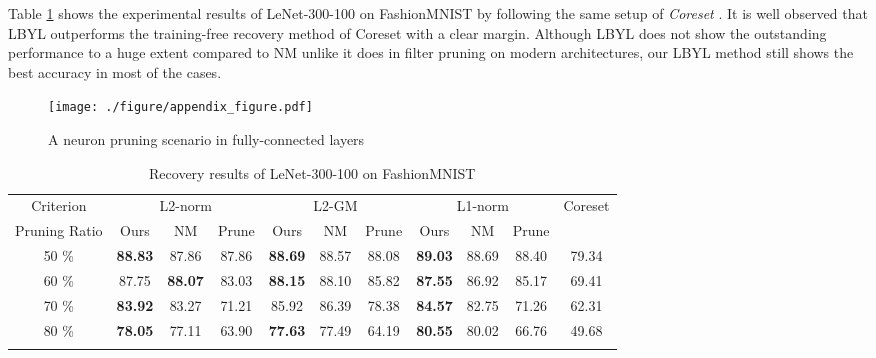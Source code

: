 Table \ref{tab:LeNet_FashionMNIST} shows the experimental results of LeNet-300-100 on FashionMNIST by following the same setup of \textit{Coreset} \cite{CoreSet_ICLR}. It is well observed that LBYL outperforms the training-free recovery method of Coreset with a clear margin. Although LBYL does not show the outstanding performance to a huge extent compared to NM \cite{NM} unlike it does in filter pruning on modern architectures, our LBYL method still shows the best accuracy in most of the cases.


\begin{figure*}[t!]
   \centering 
    \texttt{[image: ./figure/appendix\_figure.pdf]}
   \caption{A neuron pruning scenario in fully-connected layers}
   \label{fig:appendix_figure}
\end{figure*}


\begin{table}[]
\centering
\begin{tabular}{c||ccc||ccc||ccc||c}\hline Criterion& \multicolumn{3}{c||}{L2-norm}& \multicolumn{3}{c||}{L2-GM}& \multicolumn{3}{c||}{L1-norm}& \multirow{2}{*}{Coreset} \\ \cline{1-10}
Pruning Ratio& \multicolumn{1}{c|}{Ours}& \multicolumn{1}{c|}{NM}& Prune & \multicolumn{1}{c|}{Ours}& \multicolumn{1}{c|}{NM}& Prune & \multicolumn{1}{c|}{Ours}& \multicolumn{1}{c|}{NM}& Prune &\\ \hline \Xhline{2\arrayrulewidth}
50 \%& \multicolumn{1}{c|}{\textbf{88.83}} & \multicolumn{1}{c|}{87.86}          & 87.86 & \multicolumn{1}{c|}{\textbf{88.69}}  & \multicolumn{1}{c|}{88.57} & 88.08 & \multicolumn{1}{c|}{\textbf{89.03}} & \multicolumn{1}{c|}{88.69} & 88.40 & 79.34\\ \hline
60 \%& \multicolumn{1}{c|}{87.75}& \multicolumn{1}{c|}{\textbf{88.07}} & 83.03 & \multicolumn{1}{c|}{\textbf{88.15}}  & \multicolumn{1}{c|}{88.10} & 85.82 & \multicolumn{1}{c|}{\textbf{87.55}} & \multicolumn{1}{c|}{86.92} & 85.17 & 69.41\\ \hline
70 \%& \multicolumn{1}{c|}{\textbf{83.92}} & \multicolumn{1}{c|}{83.27}& 71.21 & \multicolumn{1}{c|}{85.92}& \multicolumn{1}{c|}{86.39} & 78.38 & \multicolumn{1}{c|}{\textbf{84.57}} & \multicolumn{1}{c|}{82.75} & 71.26 & 62.31\\ \hline
80 \%& \multicolumn{1}{c|}{\textbf{78.05}} & \multicolumn{1}{c|}{77.11}& 63.90 & \multicolumn{1}{c|}{\textbf{77.63}} & \multicolumn{1}{c|}{77.49} & 64.19 & \multicolumn{1}{c|}{\textbf{80.55}} & \multicolumn{1}{c|}{80.02} & 66.76 & 49.68\\ \hline \Xhline{2\arrayrulewidth}
\end{tabular}
\caption{Recovery results of LeNet-300-100 on FashionMNIST }
\label{tab:LeNet_FashionMNIST}
\end{table}


